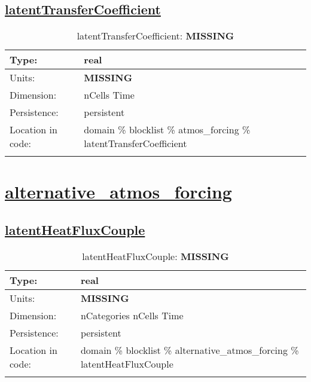 \subsection[latentTransferCoefficient]{\hyperref[sec:var_tab_atmos_forcing]{latentTransferCoefficient}}
\label{subsec:var_sec_atmos_forcing_latentTransferCoefficient}
\begin{center}
\begin{longtable}{| p{2.0in} | p{4.0in} |}
        \hline 
        Type: & real \\
        \hline 
        Units: & {\bf \color{red} MISSING} \\
        \hline 
        Dimension: & nCells Time \\
        \hline 
        Persistence: & persistent \\
        \hline 
         Location in code: & domain \% blocklist \% atmos\_forcing \% latentTransferCoefficient \\
         \hline 
    \caption{latentTransferCoefficient: {\bf \color{red} MISSING}}
\end{longtable}
\end{center}
\section[alternative\_atmos\_forcing]{\hyperref[sec:var_tab_alternative_atmos_forcing]{alternative\_atmos\_forcing}}
\label{sec:var_sec_alternative_atmos_forcing}
\subsection[latentHeatFluxCouple]{\hyperref[sec:var_tab_alternative_atmos_forcing]{latentHeatFluxCouple}}
\label{subsec:var_sec_alternative_atmos_forcing_latentHeatFluxCouple}
\begin{center}
\begin{longtable}{| p{2.0in} | p{4.0in} |}
        \hline 
        Type: & real \\
        \hline 
        Units: & {\bf \color{red} MISSING} \\
        \hline 
        Dimension: & nCategories nCells Time \\
        \hline 
        Persistence: & persistent \\
        \hline 
         Location in code: & domain \% blocklist \% alternative\_atmos\_forcing \% latentHeatFluxCouple \\
         \hline 
    \caption{latentHeatFluxCouple: {\bf \color{red} MISSING}}
\end{longtable}
\end{center}
